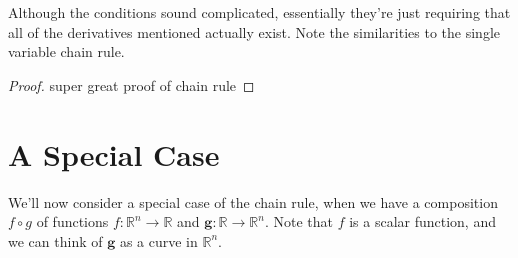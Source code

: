 \documentclass{ximera}
\begin{document}
 Although the conditions sound complicated, essentially they're just requiring that all of the derivatives mentioned actually exist. Note the similarities to the single variable chain rule.
 
\begin{proof}
super great proof of chain rule
\end{proof}

\section*{A Special Case}

We'll now consider a special case of the chain rule, when we have a composition $f\circ g$ of functions $f:\mathbb{R}^n\rightarrow\mathbb{R}$ and $\mathbf{g}:\mathbb{R}\rightarrow\mathbb{R}^n$. Note that $f$ is a scalar function, and we can think of $\mathbf{g}$ as a curve in $\mathbb{R}^n$.
\end{document}
